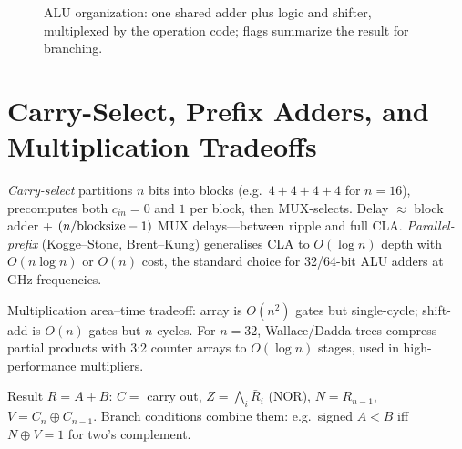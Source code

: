 \begin{figure}[h]
\centering
{}
\caption{ALU organization: one shared adder plus logic and shifter, multiplexed by the operation code; flags summarize the result for branching.}
\label{fig:alu}
\end{figure}


\section{Carry-Select, Prefix Adders, and Multiplication Tradeoffs}
\emph{Carry-select} partitions $n$ bits into blocks (e.g.\ $4+4+4+4$ for $n=16$), precomputes both $c_{in}=0$ and $1$ per block,
then MUX-selects. Delay $\approx$ block adder + $(n/{\rm blocksize}-1)$ MUX delays---between ripple and full CLA.
\emph{Parallel-prefix} (Kogge--Stone, Brent--Kung) generalises CLA to $O(\log n)$ depth with $O(n\log n)$ or $O(n)$ cost,
the standard choice for 32/64-bit ALU adders at GHz frequencies.

Multiplication area--time tradeoff: array is $O(n^2)$ gates but single-cycle; shift-add is $O(n)$ gates but $n$ cycles.
For $n=32$, Wallace/Dadda trees compress partial products with 3:2 counter arrays to $O(\log n)$ stages, used in high-performance multipliers.
\begin{example}
Result $R=A+B$: $C=$ carry out, $Z=\bigwedge_i \bar R_i$ (NOR), $N=R_{n-1}$, $V=C_n\oplus C_{n-1}$.
Branch conditions combine them: e.g.\ signed $A<B$ iff $N\oplus V=1$ for two's complement.
\end{example}


